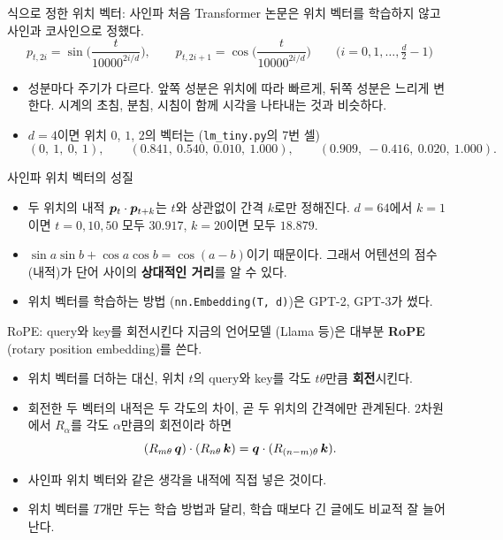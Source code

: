 \documentclass[aspectratio=169,11pt]{beamer}
\begin{document}
\begin{frame}{식으로 정한 위치 벡터: 사인파}
처음 Transformer 논문은 위치 벡터를 학습하지 않고 사인과 코사인으로 정했다.
\[
p_{t,2i}=\sin\!\Big(\frac{t}{10000^{2i/d}}\Big),\qquad
p_{t,2i+1}=\cos\!\Big(\frac{t}{10000^{2i/d}}\Big)\qquad
\big(i=0,1,\dots,\tfrac d2-1\big)
\]
\begin{itemize}
\item 성분마다 주기가 다르다. 앞쪽 성분은 위치에 따라 빠르게, 뒤쪽 성분은 느리게 변한다.
  시계의 초침, 분침, 시침이 함께 시각을 나타내는 것과 비슷하다.
\item $d=4$이면 위치 $0$, $1$, $2$의 벡터는 (\texttt{lm\_tiny.py}의 7번 셀)
\[
(0,\ 1,\ 0,\ 1),\qquad (0.841,\ 0.540,\ 0.010,\ 1.000),\qquad (0.909,\ -0.416,\ 0.020,\ 1.000).
\]
\end{itemize}
\end{frame}

\begin{frame}{사인파 위치 벡터의 성질}
\vskip1mm
\begin{itemize}
\item 두 위치의 내적 $\bm{p}_t\cdot\bm{p}_{t+k}$는 $t$와 상관없이 간격 $k$로만 정해진다.
  $d=64$에서 $k=1$이면 $t=0,10,50$ 모두 $30.917$, $k=20$이면 모두 $18.879$.
\item $\sin a\sin b+\cos a\cos b=\cos(a-b)$이기 때문이다.
  그래서 어텐션의 점수 (내적)가 단어 사이의 \textbf{상대적인 거리}를 알 수 있다.
\item 위치 벡터를 학습하는 방법 (\texttt{nn.Embedding(T, d)})은 GPT-2, GPT-3가 썼다.
\end{itemize}
\end{frame}

\begin{frame}{RoPE: query와 key를 회전시킨다}
지금의 언어모델 (Llama 등)은 대부분 \textbf{RoPE} (rotary position embedding)를 쓴다.
\begin{itemize}
\item 위치 벡터를 더하는 대신, 위치 $t$의 query와 key를 각도 $t\theta$만큼 \textbf{회전}시킨다.
\item 회전한 두 벡터의 내적은 두 각도의 차이, 곧 두 위치의 간격에만 관계된다.
  $2$차원에서 $R_\alpha$를 각도 $\alpha$만큼의 회전이라 하면
\[
(R_{m\theta}\,\bm{q})\cdot(R_{n\theta}\,\bm{k})=\bm{q}\cdot(R_{(n-m)\theta}\,\bm{k}).
\]
\item 사인파 위치 벡터와 같은 생각을 내적에 직접 넣은 것이다.
\item 위치 벡터를 $T$개만 두는 학습 방법과 달리,
  학습 때보다 긴 글에도 비교적 잘 늘어난다.
\end{itemize}
\end{frame}
\end{document}

